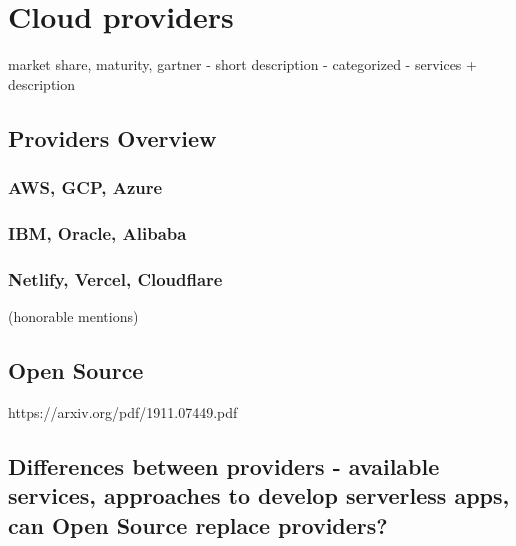 \chapter{Cloud providers}

market share, maturity, gartner
- short description
- categorized - services + description

\section*{Providers Overview}

\subsection*{AWS, GCP, Azure}

\subsection*{IBM, Oracle, Alibaba}

\subsection*{Netlify, Vercel, Cloudflare}

(honorable mentions)

\section*{Open Source}

https://arxiv.org/pdf/1911.07449.pdf

\section*{Differences between providers - available services, approaches to develop serverless apps, can Open Source replace providers?}

